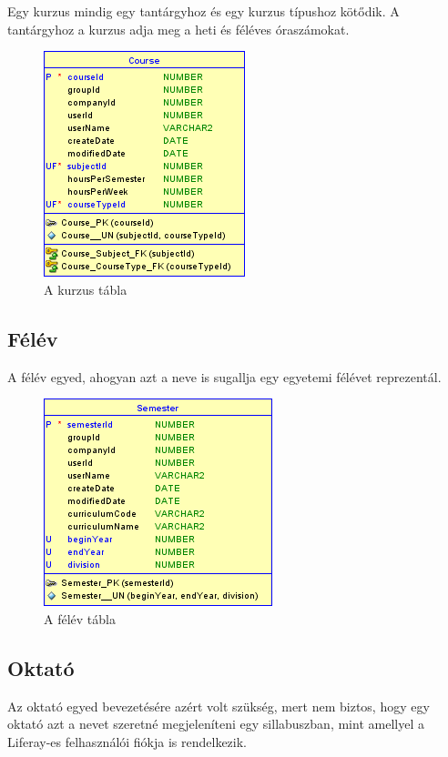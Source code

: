 \documentclass[hidelinks, 12pt, a4paper]{report}
\begin{document}
Egy kurzus mindig egy tantárgyhoz és egy kurzus típushoz kötődik. A tantárgyhoz a kurzus adja meg a heti és féléves óraszámokat.

\begin{figure}[H]
    \centering
	\includegraphics{course.png}
	\caption{A kurzus tábla}
\end{figure}

\subsection{Félév}

A félév egyed, ahogyan azt a neve is sugallja egy egyetemi félévet reprezentál.

\begin{figure}[H]
    \centering
	\includegraphics{semester.png}
	\caption{A félév tábla}
\end{figure}

\subsection{Oktató}

Az oktató egyed bevezetésére azért volt szükség, mert nem biztos, hogy egy oktató azt a nevet szeretné megjeleníteni egy sillabuszban, mint amellyel a Liferay-es felhasználói fiókja is rendelkezik.
\end{document}
